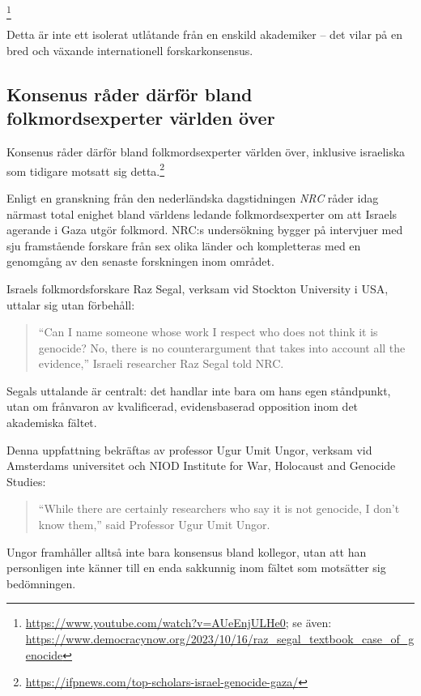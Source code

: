 \footnote{\url{https://www.youtube.com/watch?v=AUeEnjULHe0}; se även: \url{https://www.democracynow.org/2023/10/16/raz_segal_textbook_case_of_genocide}}

Detta är inte ett isolerat utlåtande från en enskild akademiker – det vilar på en bred och växande internationell forskarkonsensus.


\subsection{Konsenus råder därför bland folkmordsexperter världen över}


Konsenus råder därför bland folkmordsexperter världen över, inklusive israeliska som tidigare motsatt sig detta.\footnote{\url{https://ifpnews.com/top-scholars-israel-genocide-gaza/}}

Enligt en granskning från den nederländska dagstidningen \textit{NRC} råder idag närmast total enighet bland världens ledande folkmordsexperter om att Israels agerande i Gaza utgör folkmord. NRC:s undersökning bygger på intervjuer med sju framstående forskare från sex olika länder och kompletteras med en genomgång av den senaste forskningen inom området. 

Israels folkmordsforskare Raz Segal, verksam vid Stockton University i USA, uttalar sig utan förbehåll:

\begin{quote}
“Can I name someone whose work I respect who does not think it is genocide? No, there is no counterargument that takes into account all the evidence,” Israeli researcher Raz Segal told NRC.
\end{quote}

Segals uttalande är centralt: det handlar inte bara om hans egen ståndpunkt, utan om frånvaron av kvalificerad, evidensbaserad opposition inom det akademiska fältet.

Denna uppfattning bekräftas av professor Ugur Umit Ungor, verksam vid Amsterdams universitet och NIOD Institute for War, Holocaust and Genocide Studies:

\begin{quote}
“While there are certainly researchers who say it is not genocide, I don’t know them,” said Professor Ugur Umit Ungor.
\end{quote}

Ungor framhåller alltså inte bara konsensus bland kollegor, utan att han personligen inte känner till en enda sakkunnig inom fältet som motsätter sig bedömningen.

